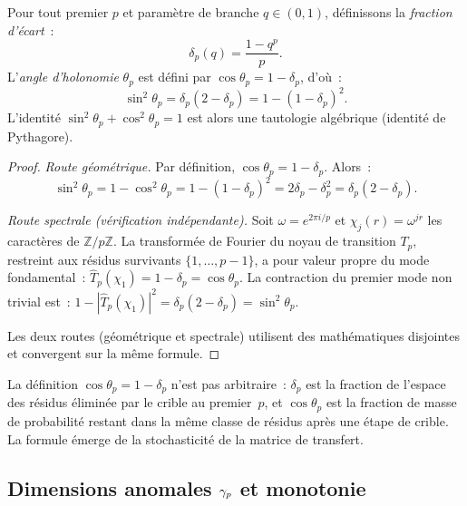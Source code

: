 \documentclass[12pt,a4paper]{article}
\begin{document}
\begin{theorembox}
Pour tout premier $p$ et param\`etre de branche $q \in (0,1)$,
d\'efinissons la \emph{fraction d'\'ecart}~:
\begin{equation}
  \delta_p(q) = \frac{1 - q^p}{p}.
  \tag{A.6}
\end{equation}
L'\emph{angle d'holonomie} $\theta_p$ est d\'efini par
$\cos\theta_p = 1 - \delta_p$, d'o\`u~:
\begin{equation}
  \sin^2\!\theta_p = \delta_p(2 - \delta_p) = 1 - (1-\delta_p)^2.
  \tag{A.7}
\end{equation}
L'identit\'e $\sin^2\!\theta_p + \cos^2\!\theta_p = 1$ est alors une
tautologie alg\'ebrique (identit\'e de Pythagore).

\begin{proof}
\emph{Route g\'eom\'etrique.}
Par d\'efinition, $\cos\theta_p = 1 - \delta_p$. Alors~:
\[
  \sin^2\!\theta_p = 1 - \cos^2\!\theta_p
  = 1 - (1-\delta_p)^2 = 2\delta_p - \delta_p^2 = \delta_p(2-\delta_p).
\]

\emph{Route spectrale (v\'erification ind\'ependante).}
Soit $\omega = e^{2\pi i/p}$ et $\chi_j(r) = \omega^{jr}$ les
caract\`eres de $\mathbb{Z}/p\mathbb{Z}$. La transform\'ee de Fourier
du noyau de transition $T_p$, restreint aux r\'esidus survivants
$\{1, \ldots, p-1\}$, a pour valeur propre du mode fondamental~:
$\widehat{T}_p(\chi_1) = 1 - \delta_p = \cos\theta_p$. La contraction
du premier mode non trivial est~:
$1 - |\widehat{T}_p(\chi_1)|^2 = \delta_p(2-\delta_p) = \sin^2\!\theta_p$.

Les deux routes (g\'eom\'etrique et spectrale) utilisent des
math\'ematiques disjointes et convergent sur la m\^eme formule.
\end{proof}
\end{theorembox}

\begin{remark}
La d\'efinition $\cos\theta_p = 1 - \delta_p$ n'est pas arbitraire~:
$\delta_p$ est la fraction de l'espace des r\'esidus \'elimin\'ee par le
crible au premier~$p$, et $\cos\theta_p$ est la fraction de masse de
probabilit\'e restant dans la m\^eme classe de r\'esidus apr\`es une
\'etape de crible. La formule \'emerge de la stochasticit\'e de la
matrice de transfert.
\end{remark}

\subsection{Dimensions anomales $\gamma_{p}$ et monotonie}
\label{app:gamma}
\end{document}
